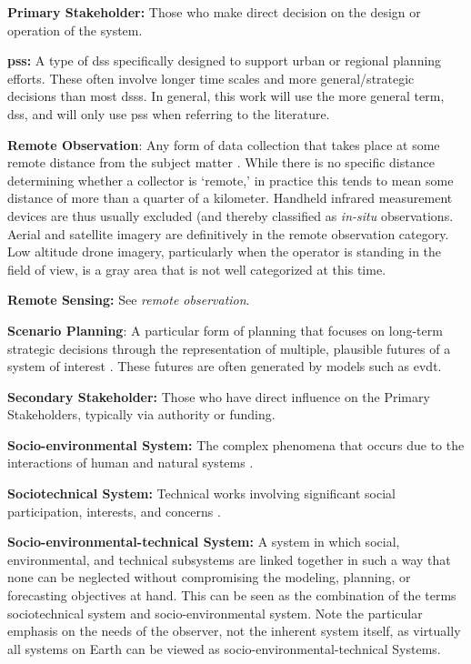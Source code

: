 \textbf{Primary Stakeholder:} Those who make direct decision on the design or operation of the system.

\textbf{\acf{pss}:} A type of \ac{dss} specifically designed to support urban or regional planning efforts. These often involve longer time scales and more general/strategic decisions than most \acp{dss}. In general, this work will use the more general term, \ac{dss}, and will only use \ac{pss} when referring to the literature.

\textbf{Remote Observation}: Any form of data collection that takes place at some remote distance from the subject matter \cite{jensenRemoteSensingEnvironment2006}. While there is no specific distance determining whether a collector is `remote,' in practice this tends to mean some distance of more than a quarter of a kilometer. Handheld infrared measurement devices are thus usually excluded (and thereby classified as \textit{in-situ} observations. Aerial and satellite imagery are definitively in the remote observation category. Low altitude drone imagery, particularly when the operator is standing in the field of view, is a gray area that is not well categorized at this time.

\textbf{Remote Sensing:} See \textit{remote observation}.

\textbf{Scenario Planning}: A particular form of planning that focuses on long-term strategic decisions through the representation of multiple, plausible futures of a system of interest \cite{goodspeedScenarioPlanningCities2020}. These futures are often generated by models such as \ac{evdt}.

\textbf{Secondary Stakeholder:} Those who have direct influence on the Primary Stakeholders, typically via authority or funding.

\textbf{Socio-environmental System:} The complex phenomena that occurs due to the interactions of human and natural systems \cite{elsawahEightGrandChallenges2020}.

\textbf{Sociotechnical System:} Technical works involving significant social participation, interests, and concerns \cite{maierArtSystemsArchitecting2009}.

\textbf{Socio-environmental-technical System:} A system in which social, environmental, and technical subsystems are linked together in such a way that none can be neglected without compromising the modeling, planning, or forecasting objectives at hand. This can be seen as the combination of the terms sociotechnical system and socio-environmental system. Note the particular emphasis on the needs of the observer, not the inherent system itself, as virtually all systems on Earth can be viewed as socio-environmental-technical Systems.

